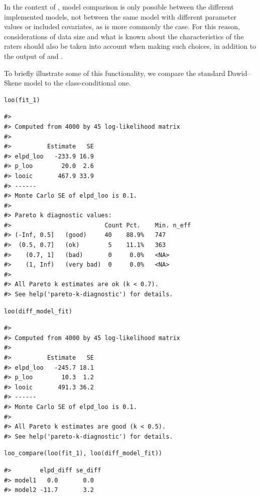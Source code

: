 In the context of , model comparison is only possible between
the different implemented models, not between the same model with different
parameter values or included covariates, as is more commonly the case. For
this reason, considerations of data size and what is known about the
characteristics of the raters should also be taken into account when making
such choices, in addition to the output of  and .

To briefly illustrate some of this functionality, we compare the standard
Dawid--Skene model to the class-conditional one.

\begin{verbatim}
loo(fit_1)
\end{verbatim}

\begin{verbatim}
#> 
#> Computed from 4000 by 45 log-likelihood matrix
#> 
#>          Estimate   SE
#> elpd_loo   -233.9 16.9
#> p_loo        20.0  2.6
#> looic       467.9 33.9
#> ------
#> Monte Carlo SE of elpd_loo is 0.1.
#> 
#> Pareto k diagnostic values:
#>                          Count Pct.    Min. n_eff
#> (-Inf, 0.5]   (good)     40    88.9%   747       
#>  (0.5, 0.7]   (ok)        5    11.1%   363       
#>    (0.7, 1]   (bad)       0     0.0%   <NA>      
#>    (1, Inf)   (very bad)  0     0.0%   <NA>      
#> 
#> All Pareto k estimates are ok (k < 0.7).
#> See help('pareto-k-diagnostic') for details.
\end{verbatim}

\begin{verbatim}
loo(diff_model_fit)
\end{verbatim}

\begin{verbatim}
#> 
#> Computed from 4000 by 45 log-likelihood matrix
#> 
#>          Estimate   SE
#> elpd_loo   -245.7 18.1
#> p_loo        10.3  1.2
#> looic       491.3 36.2
#> ------
#> Monte Carlo SE of elpd_loo is 0.1.
#> 
#> All Pareto k estimates are good (k < 0.5).
#> See help('pareto-k-diagnostic') for details.
\end{verbatim}

\begin{verbatim}
loo_compare(loo(fit_1), loo(diff_model_fit))
\end{verbatim}

\begin{verbatim}
#>        elpd_diff se_diff
#> model1   0.0       0.0  
#> model2 -11.7       3.2
\end{verbatim}

